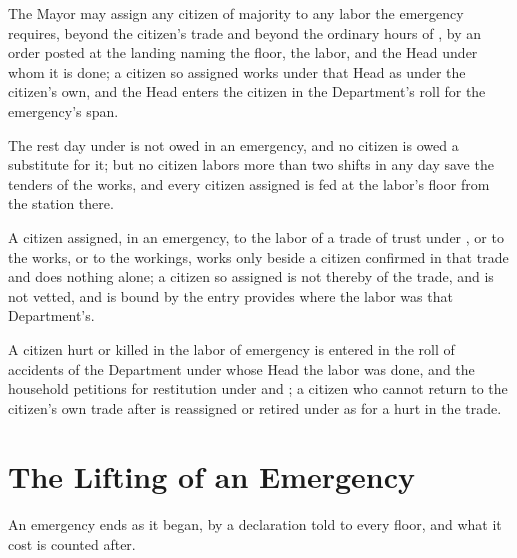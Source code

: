 \begin{clauses}
\item The Mayor may assign any citizen of majority to any labor the emergency requires, beyond the citizen's trade and beyond the ordinary hours of , by an order posted at the landing naming the floor, the labor, and the Head under whom it is done; a citizen so assigned works under that Head as under the citizen's own, and the Head enters the citizen in the Department's roll for the emergency's span.
\item The rest day under  is not owed in an emergency, and no citizen is owed a substitute for it; but no citizen labors more than two shifts in any day save the tenders of the works, and every citizen assigned is fed at the labor's floor from the station there.
\item A citizen assigned, in an emergency, to the labor of a trade of trust under , or to the works, or to the workings, works only beside a citizen confirmed in that trade and does nothing alone; a citizen so assigned is not thereby of the trade, and is not vetted, and is bound by the entry  provides where the labor was that Department's.
\item A citizen hurt or killed in the labor of emergency is entered in the roll of accidents of the Department under whose Head the labor was done, and the household petitions for restitution under  and ; a citizen who cannot return to the citizen's own trade after is reassigned or retired under  as for a hurt in the trade.
\end{clauses}

\section{The Lifting of an Emergency}
\label{sec:emergency:lifting-of-an-emergency}

An emergency ends as it began, by a declaration told to every floor, and what it cost is counted after.

